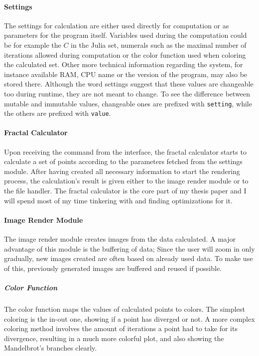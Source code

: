 \documentclass[10pt,a4paper,titlepage]{article}
\begin{document}
	\paragraph{Settings}
	The settings for calculation are either used directly for computation or as parameters for the program itself. Variables used during the computation could be for example the \(C\) in the Julia set, numerals such as the maximal number of iterations allowed during computation or the color function used when coloring the calculated set. Other more technical information regarding the system, for instance available RAM, CPU name or the version of the program, may also be stored there. Although the word settings suggest that these values are changeable too during runtime, they are not meant to change. To see the difference between mutable and immutable values, changeable ones are prefixed with \verb|setting|, while the others are prefixed with \verb|value|.
	\paragraph{Fractal Calculator}
	Upon receiving the command from the interface, the fractal calculator starts to calculate a set of points according to the parameters fetched from the settings module. After having created all necessary information to start the rendering process, the calculation's result is given either to the image render module or to the file handler. The fractal calculator is the core part of my thesis paper and I will spend most of my time tinkering with and finding optimizations for it.
	\paragraph{Image Render Module}
	
	The image render module creates images from the data calculated. A major advantage of this module is the buffering of data; Since the user will zoom in only gradually, new images created are often based on already used data. To make use of this, previously generated images are buffered and reused if possible.
	\subparagraph{Color Function}
	The color function maps the values of calculated points to colors. The simplest coloring is the in-out one, showing if a point has diverged or not. A more complex coloring method involves the amount of iterations a point had to take for its divergence, resulting in a much more colorful plot, and also showing the Mandelbrot's branches clearly.
\end{document}
